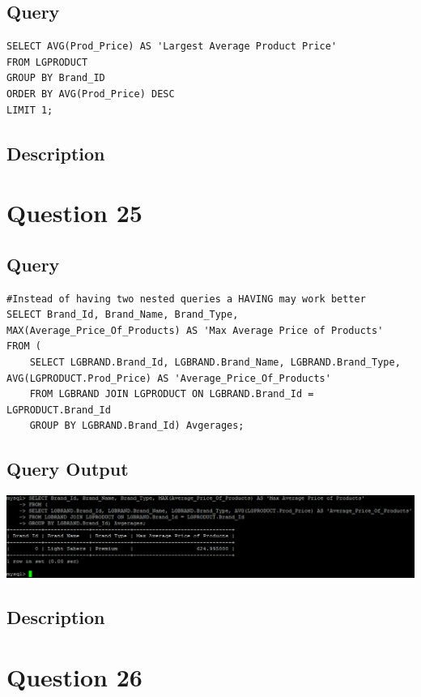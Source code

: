 \documentclass[a4paper,10pt]{article}
\begin{document}
 \subsection{Query}
          \lstset{
            language=SQL,
            breaklines=true
            }
        \begin{lstlisting}[frame=single]
        SELECT AVG(Prod_Price) AS 'Largest Average Product Price'
FROM LGPRODUCT
GROUP BY Brand_ID
ORDER BY AVG(Prod_Price) DESC
LIMIT 1;
        \end{lstlisting}
\subsection{Description}
\section*{Question 25}
 \subsection{Query}
          \lstset{
            language=SQL,
            breaklines=true
            }
        \begin{lstlisting}[frame=single]
        #Instead of having two nested queries a HAVING may work better
SELECT Brand_Id, Brand_Name, Brand_Type, MAX(Average_Price_Of_Products) AS 'Max Average Price of Products'
FROM (
	SELECT LGBRAND.Brand_Id, LGBRAND.Brand_Name, LGBRAND.Brand_Type, AVG(LGPRODUCT.Prod_Price) AS 'Average_Price_Of_Products'
	FROM LGBRAND JOIN LGPRODUCT ON LGBRAND.Brand_Id = LGPRODUCT.Brand_Id
	GROUP BY LGBRAND.Brand_Id) Avgerages;

        \end{lstlisting}
\subsection{Query Output}
           \includegraphics{Queries/Question_25/Question_25_screenshot.PNG}
\subsection{Description}
\section*{Question 26}
\end{document}
